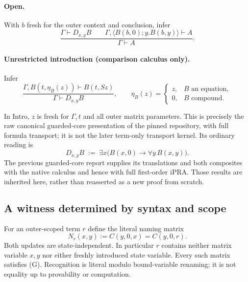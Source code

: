 \documentclass[11pt,letterpaper]{article}
\theoremstyle{definition}\newtheorem{definition}[theorem]{Definition}
\theoremstyle{remark}\newtheorem{remark}[theorem]{Remark}
\begin{document}
\paragraph{Open.} With $b$ fresh for the outer context and conclusion, infer
\[
 \frac{\Gamma\vdash D_{x,y}B\qquad
       \Gamma,\langle B(b,0);y.B(b,y)\rangle\vdash A}
      {\Gamma\vdash A}.
\]
\paragraph{Unrestricted introduction (comparison calculus only).} Infer
\[
 \frac{\Gamma,B(t,\eta_B(z))\vdash B(t,Sz)}
      {\Gamma\vdash D_{x,y}B},\qquad
 \eta_B(z)=\begin{cases}z,&B\text{ an equation},\\0,&B\text{ compound}.\end{cases}
\]

In Intro, $z$ is fresh for $\Gamma,t$ and all outer matrix parameters.
This is precisely the raw canonical guarded-core presentation of the pinned
repository, with full formula transport; it is not the later term-only
transport kernel. Its ordinary reading is
\[
 D_{x,y}B\;:=\;\exists x\bigl(B(x,0)\to\forall y\,B(x,y)\bigr).
\]
The previous guarded-core report supplies its translations and both composites
with the native calculus and hence with full first-order iPRA. Those results
are inherited here, rather than reasserted as a new proof from scratch.

\subsection{A witness determined by syntax and scope}

For an outer-scoped term $r$ define the literal naming matrix
\[
 N_r(x,y):=C(y,0,x)=C(y,0,r).                            \tag{Name matrix}
\]
Both updates are state-independent. In particular $r$ contains neither
matrix variable $x,y$ nor either freshly introduced state variable. Every
such matrix satisfies (G). Recognition is literal modulo bound-variable
renaming; it is not equality up to provability or computation.
\end{document}
